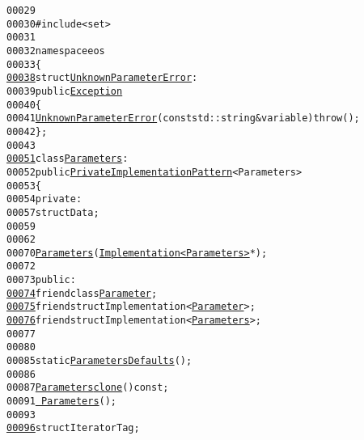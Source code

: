 \begin{footnotesize}
\begin{alltt}
00029 
00030 \textcolor{preprocessor}{#include <set>}
00031 
00032 \textcolor{keyword}{namespace }eos
00033 \{
\hypertarget{parameters_8hh_source_l00038}{}\hyperlink{structeos_1_1UnknownParameterError}{00038}     \textcolor{keyword}{struct }\hyperlink{structeos_1_1UnknownParameterError}{UnknownParameterError} :
00039         \textcolor{keyword}{public} \hyperlink{classeos_1_1Exception}{Exception}
00040     \{
00041         \hyperlink{structeos_1_1UnknownParameterError_a9c475df66b9e6316e6a1a2a93c86e4a3}{UnknownParameterError}(\textcolor{keyword}{const} std::string & variable) \textcolor{keywordflow}{throw} ();
00042     \};
00043 
\hypertarget{parameters_8hh_source_l00051}{}\hyperlink{classeos_1_1Parameters}{00051}     \textcolor{keyword}{class }\hyperlink{classeos_1_1Parameters}{Parameters} :
00052         \textcolor{keyword}{public} \hyperlink{classeos_1_1PrivateImplementationPattern}{PrivateImplementationPattern}<Parameters>
00053     \{
00054         \textcolor{keyword}{private}:
00057             \textcolor{keyword}{struct }Data;
00059 
00062 
00070             \hyperlink{classeos_1_1Parameters}{Parameters}(\hyperlink{classeos_1_1Parameters_afdc1ae1c3b0dbac4fdf6769d5f8e1fbf}{Implementation<Parameters>} *);
00072 
00073         \textcolor{keyword}{public}:
\hypertarget{parameters_8hh_source_l00074}{}\hyperlink{classeos_1_1Parameters_ac1c4326186d13e3c1f20eb8f39a7b5a2}{00074}             \textcolor{keyword}{friend} \textcolor{keyword}{class }\hyperlink{classeos_1_1Parameter}{Parameter};
\hypertarget{parameters_8hh_source_l00075}{}\hyperlink{classeos_1_1Parameters_a321bcfc7467eb8a305a7e15f232efa38}{00075}             \textcolor{keyword}{friend} \textcolor{keyword}{struct }Implementation<\hyperlink{classeos_1_1Parameter}{Parameter}>;
\hypertarget{parameters_8hh_source_l00076}{}\hyperlink{classeos_1_1Parameters_afdc1ae1c3b0dbac4fdf6769d5f8e1fbf}{00076}             \textcolor{keyword}{friend} \textcolor{keyword}{struct }Implementation<\hyperlink{classeos_1_1Parameters}{Parameters}>;
00077 
00080 
00085             \textcolor{keyword}{static} \hyperlink{classeos_1_1Parameters}{Parameters} \hyperlink{classeos_1_1Parameters_a1fa30b2210827623e6bf9f3ac4d2fd94}{Defaults}();
00086 
00087             \hyperlink{classeos_1_1Parameters}{Parameters} \hyperlink{classeos_1_1Parameters_a273f5bad065bc47b62981734a2e3576e}{clone}() \textcolor{keyword}{const};
00091             \hyperlink{classeos_1_1Parameters_aa1f509653fa20a2599a47706042685f1}{~Parameters}();
00093 
\hypertarget{parameters_8hh_source_l00096}{}\hyperlink{classeos_1_1Parameters_ad4378a4b3c462f8aa122b3484bce1b4f}{00096}             \textcolor{keyword}{struct }IteratorTag;

\end{alltt}
\end{footnotesize}
